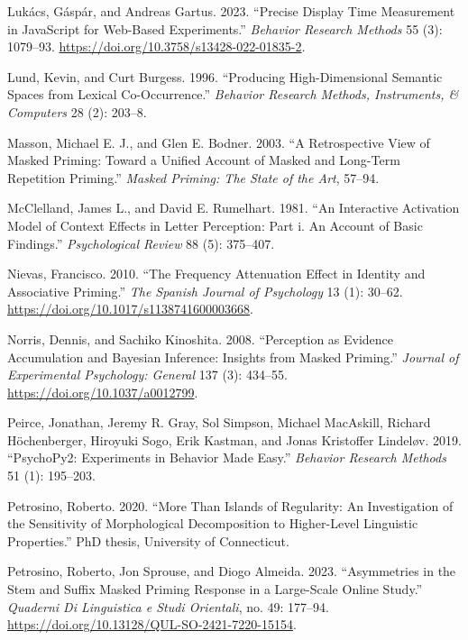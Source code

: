 \documentclass[
]{interact}
\newlength{\cslhangindent}
\newenvironment{CSLReferences}[2] %
 {\begin{list}{}{%
  \setlength{\itemindent}{0pt}
  \setlength{\leftmargin}{0pt}
  \setlength{\parsep}{0pt}
  \ifodd #1
   \setlength{\leftmargin}{\cslhangindent}
   \setlength{\itemindent}{-1\cslhangindent}
  \fi
  \setlength{\itemsep}{#2\baselineskip}}}
 {\end{list}}
\begin{document}
\begin{CSLReferences}{1}{0}
Lukács, Gáspár, and Andreas Gartus. 2023. {``Precise Display Time
Measurement in JavaScript for Web-Based Experiments.''} \emph{Behavior
Research Methods} 55 (3): 1079--93.
\url{https://doi.org/10.3758/s13428-022-01835-2}.

Lund, Kevin, and Curt Burgess. 1996. {``Producing High-Dimensional
Semantic Spaces from Lexical Co-Occurrence.''} \emph{Behavior Research
Methods, Instruments, {\&} Computers} 28 (2): 203--8.

Masson, Michael E. J., and Glen E. Bodner. 2003. {``A Retrospective View
of Masked Priming: Toward a Unified Account of Masked and Long-Term
Repetition Priming.''} \emph{Masked Priming: The State of the Art},
57--94.

McClelland, James L., and David E. Rumelhart. 1981. {``An Interactive
Activation Model of Context Effects in Letter Perception: Part i. An
Account of Basic Findings.''} \emph{Psychological Review} 88 (5):
375--407.

Nievas, Francisco. 2010. {``The Frequency Attenuation Effect in Identity
and Associative Priming.''} \emph{The Spanish Journal of Psychology} 13
(1): 30--62. \url{https://doi.org/10.1017/s1138741600003668}.

Norris, Dennis, and Sachiko Kinoshita. 2008. {``Perception as Evidence
Accumulation and Bayesian Inference: Insights from Masked Priming.''}
\emph{Journal of Experimental Psychology: General} 137 (3): 434--55.
\url{https://doi.org/10.1037/a0012799}.

Peirce, Jonathan, Jeremy R. Gray, Sol Simpson, Michael MacAskill,
Richard Höchenberger, Hiroyuki Sogo, Erik Kastman, and Jonas Kristoffer
Lindeløv. 2019. {``PsychoPy2: Experiments in Behavior Made Easy.''}
\emph{Behavior Research Methods} 51 (1): 195--203.

Petrosino, Roberto. 2020. {``More Than Islands of Regularity: An
Investigation of the Sensitivity of Morphological Decomposition to
Higher-Level Linguistic Properties.''} PhD thesis, University of
Connecticut.

Petrosino, Roberto, Jon Sprouse, and Diogo Almeida. 2023. {``Asymmetries
in the Stem and Suffix Masked Priming Response in a Large-Scale Online
Study.''} \emph{Quaderni Di Linguistica e Studi Orientali}, no. 49:
177--94. \url{https://doi.org/10.13128/QUL-SO-2421-7220-15154}.


\end{CSLReferences}
\end{document}
